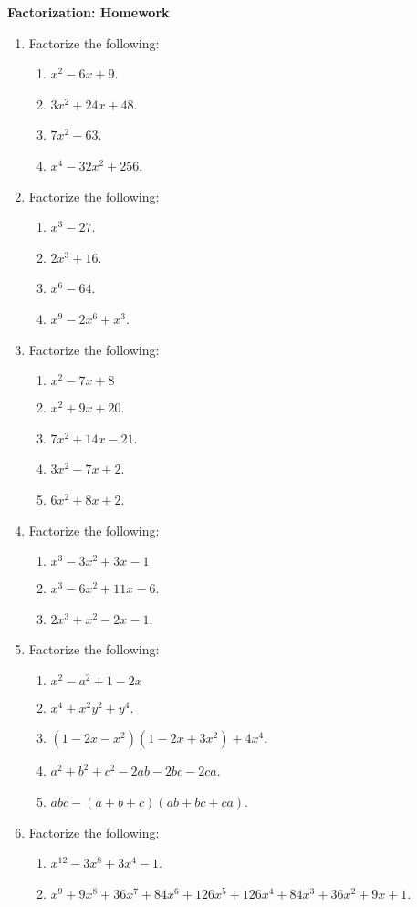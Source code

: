 \documentclass[12pt]{article}
\begin{document}
    \begin{center}
        \textbf{Factorization: Homework}
    \end{center}

    \begin{enumerate}
        \item Factorize the following:\begin{enumerate}
            \item $x^2-6x+9$.
            \item $3x^2+24x+48$.
            \item $7x^2-63$.
            \item $x^4-32x^2+256$.
        \end{enumerate}
        \item Factorize the following:\begin{enumerate}
            \item $x^3-27$.
            \item $2x^3+16$.
            \item $x^6-64$.
            \item $x^9-2x^6+x^3$.
        \end{enumerate}
        \item Factorize the following:\begin{enumerate}
            \item $x^2-7x+8$
            \item $x^2+9x+20$.
            \item $7x^2+14x-21$.
            \item $3x^2-7x+2$.
            \item $6x^2+8x+2$.
        \end{enumerate}
        \item Factorize the following:\begin{enumerate}
            \item $x^3-3x^2+3x-1$
            \item $x^3-6x^2+11x-6$.
            \item $2x^3+x^2-2x-1$.
        \end{enumerate}
        \item Factorize the following:\begin{enumerate}
            \item $x^2-a^2+1-2x$
            \item $x^4+x^2y^2+y^4$.
            \item $(1-2x-x^2)(1-2x+3x^2)+4x^4$.
            \item $a^2+b^2+c^2-2ab-2bc-2ca$.
            \item $abc-(a+b+c)(ab+bc+ca)$.
        \end{enumerate}
        \item Factorize the following:\begin{enumerate}
            \item $x^{12}-3x^8+3x^4-1$.
            \item $x^9+9x^8+36x^7+84x^6+126x^5+126x^4+84x^3+36x^2+9x+1$.
        \end{enumerate}
    \end{enumerate}
\end{document}
